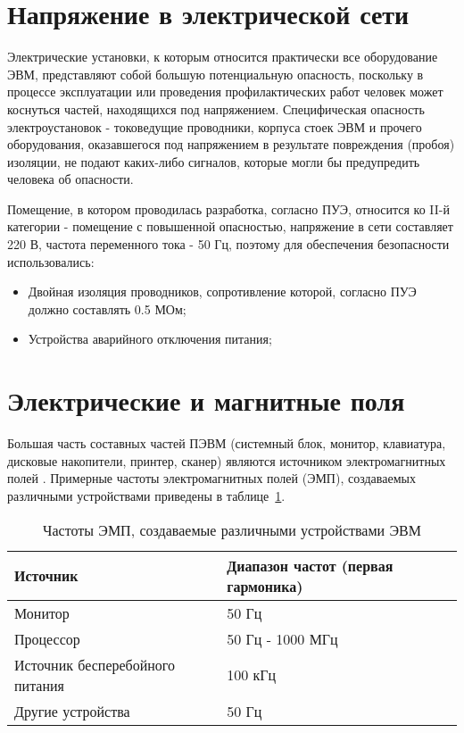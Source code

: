 \section{Напряжение в электрической сети}
Электрические установки, к которым относится практически все оборудование ЭВМ, представляют собой большую потенциальную опасность, поскольку в процессе эксплуатации или проведения профилактических работ человек может коснуться частей, находящихся под напряжением. Специфическая опасность электроустановок - токоведущие проводники, корпуса стоек ЭВМ и прочего оборудования, оказавшегося под напряжением в результате повреждения (пробоя) изоляции, не подают каких-либо сигналов, которые могли бы предупредить человека об опасности.

Помещение, в котором проводилась разработка, согласно ПУЭ, относится ко II-й категории - помещение с повышенной опасностью, напряжение в сети составляет 220 В, частота переменного тока - 50 Гц, поэтому для обеспечения безопасности использовались:
\begin{itemize}
\item Двойная изоляция проводников, сопротивление которой, согласно ПУЭ должно составлять 0.5 МОм;
\item Устройства аварийного отключения питания;
\end{itemize}


\section{Электрические и магнитные поля}
Большая часть составных частей ПЭВМ (системный блок, монитор, клавиатура, дисковые накопители, принтер, сканер) являются источником электромагнитных полей \cite{pc_izluch}. Примерные частоты электромагнитных полей (ЭМП), создаваемых различными устройствами приведены в таблице~\ref{table:ch_evm}.

\begin{table}
\caption{Частоты ЭМП, создаваемые различными устройствами ЭВМ}
\label{table:ch_evm}
\begin{tabular}{| p{} | p{} |}
\hline
Источник & Диапазон частот (первая гармоника)\\
\hline
Монитор & 50 Гц\\
\hline
Процессор & 50 Гц - 1000 МГц\\
\hline
Источник бесперебойного питания & 100 кГц\\
\hline
Другие устройства & 50 Гц\\
\hline
\end{tabular}
\end{table}


